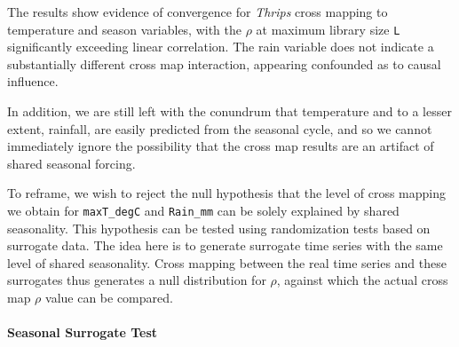 \documentclass[]{article}
\let\oldparagraph\paragraph
\renewcommand{\paragraph}[1]{\oldparagraph{#1}\mbox{}}
\begin{document}
The results show evidence of convergence for \emph{Thrips} cross mapping
to temperature and season variables, with the \(\rho\) at maximum
library size \texttt{L} significantly exceeding linear correlation. The
rain variable does not indicate a substantially different cross map
interaction, appearing confounded as to causal influence.

In addition, we are still left with the conundrum that temperature and
to a lesser extent, rainfall, are easily predicted from the seasonal
cycle, and so we cannot immediately ignore the possibility that the
cross map results are an artifact of shared seasonal forcing.

To reframe, we wish to reject the null hypothesis that the level of
cross mapping we obtain for \texttt{maxT\_degC} and \texttt{Rain\_mm}
can be solely explained by shared seasonality. This hypothesis can be
tested using randomization tests based on surrogate data. The idea here
is to generate surrogate time series with the same level of shared
seasonality. Cross mapping between the real time series and these
surrogates thus generates a null distribution for \(\rho\), against
which the actual cross map \(\rho\) value can be compared.

\hypertarget{seasonal-surrogate-test}{%
\paragraph{Seasonal Surrogate Test}\label{seasonal-surrogate-test}}
\end{document}
